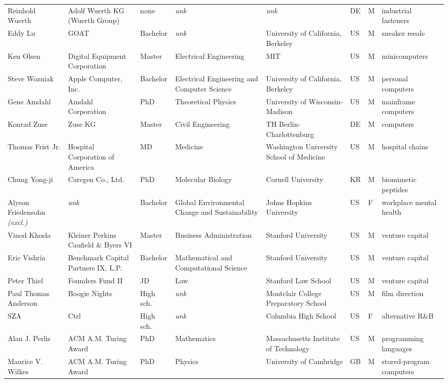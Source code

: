 \documentclass[11pt]{article}
\begin{document}
\begin{longtable}{@{}p{2.4cm}p{2.5cm}p{1.35cm}p{1.9cm}p{2.1cm}p{0.5cm}p{0.45cm}p{2.2cm}@{}}
Reinhold Wuerth & Adolf Wuerth KG (Wuerth Group) & none & \textit{unk} & \textit{unk} & DE & M & industrial fasteners \\
Eddy Lu & GOAT & Bachelor & \textit{unk} & University of California, Berkeley & US & M & sneaker resale \\
Ken Olsen & Digital Equipment Corporation & Master & Electrical Engineering & MIT & US & M & minicomputers \\
Steve Wozniak & Apple Computer, Inc. & Bachelor & Electrical Engineering and Computer Science & University of California, Berkeley & US & M & personal computers \\
Gene Amdahl & Amdahl Corporation & PhD & Theoretical Physics & University of Wisconsin-Madison & US & M & mainframe computers \\
Konrad Zuse & Zuse KG & Master & Civil Engineering & TH Berlin-Charlottenburg & DE & M & computers \\
Thomas Frist Jr. & Hospital Corporation of America & MD & Medicine & Washington University School of Medicine & US & M & hospital chains \\
Chung Yong-ji & Caregen Co., Ltd. & PhD & Molecular Biology & Cornell University & KR & M & biomimetic peptides \\
Alyson Friedensohn \textit{\scriptsize(excl.)} & \textit{unk} & Bachelor & Global Environmental Change and Sustainability & Johns Hopkins University & US & F & workplace mental health \\
Vinod Khosla & Kleiner Perkins Caufield \& Byers VI & Master & Business Administration & Stanford University & US & M & venture capital \\
Eric Vishria & Benchmark Capital Partners IX, L.P. & Bachelor & Mathematical and Computational Science & Stanford University & US & M & venture capital \\
Peter Thiel & Founders Fund II & JD & Law & Stanford Law School & US & M & venture capital \\
Paul Thomas Anderson & Boogie Nights & High sch. & \textit{unk} & Montclair College Preparatory School & US & M & film direction \\
SZA & Ctrl & High sch. & \textit{unk} & Columbia High School & US & F & alternative R\&B \\
Alan J. Perlis & ACM A.M. Turing Award & PhD & Mathematics & Massachusetts Institute of Technology & US & M & programming languages \\
Maurice V. Wilkes & ACM A.M. Turing Award & PhD & Physics & University of Cambridge & GB & M & stored-program computers \\

\end{longtable}
\end{document}
